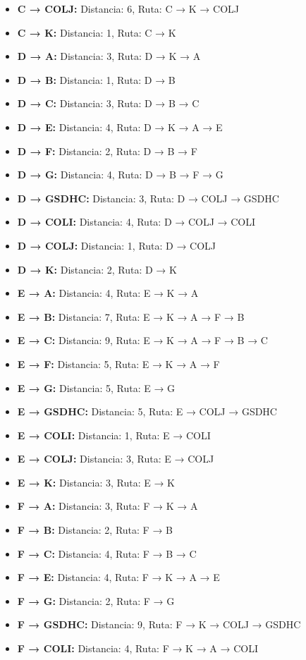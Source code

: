 \documentclass[12pt]{article}
\begin{document}
\begin{itemize}
\item \textbf{C → COLJ:} Distancia: 6, Ruta: C → K → COLJ
\item \textbf{C → K:} Distancia: 1, Ruta: C → K
\item \textbf{D → A:} Distancia: 3, Ruta: D → K → A
\item \textbf{D → B:} Distancia: 1, Ruta: D → B
\item \textbf{D → C:} Distancia: 3, Ruta: D → B → C
\item \textbf{D → E:} Distancia: 4, Ruta: D → K → A → E
\item \textbf{D → F:} Distancia: 2, Ruta: D → B → F
\item \textbf{D → G:} Distancia: 4, Ruta: D → B → F → G
\item \textbf{D → GSDHC:} Distancia: 3, Ruta: D → COLJ → GSDHC
\item \textbf{D → COLI:} Distancia: 4, Ruta: D → COLJ → COLI
\item \textbf{D → COLJ:} Distancia: 1, Ruta: D → COLJ
\item \textbf{D → K:} Distancia: 2, Ruta: D → K
\item \textbf{E → A:} Distancia: 4, Ruta: E → K → A
\item \textbf{E → B:} Distancia: 7, Ruta: E → K → A → F → B
\item \textbf{E → C:} Distancia: 9, Ruta: E → K → A → F → B → C
\item \textbf{E → F:} Distancia: 5, Ruta: E → K → A → F
\item \textbf{E → G:} Distancia: 5, Ruta: E → G
\item \textbf{E → GSDHC:} Distancia: 5, Ruta: E → COLJ → GSDHC
\item \textbf{E → COLI:} Distancia: 1, Ruta: E → COLI
\item \textbf{E → COLJ:} Distancia: 3, Ruta: E → COLJ
\item \textbf{E → K:} Distancia: 3, Ruta: E → K
\item \textbf{F → A:} Distancia: 3, Ruta: F → K → A
\item \textbf{F → B:} Distancia: 2, Ruta: F → B
\item \textbf{F → C:} Distancia: 4, Ruta: F → B → C
\item \textbf{F → E:} Distancia: 4, Ruta: F → K → A → E
\item \textbf{F → G:} Distancia: 2, Ruta: F → G
\item \textbf{F → GSDHC:} Distancia: 9, Ruta: F → K → COLJ → GSDHC
\item \textbf{F → COLI:} Distancia: 4, Ruta: F → K → A → COLI

\end{itemize}
\end{document}

